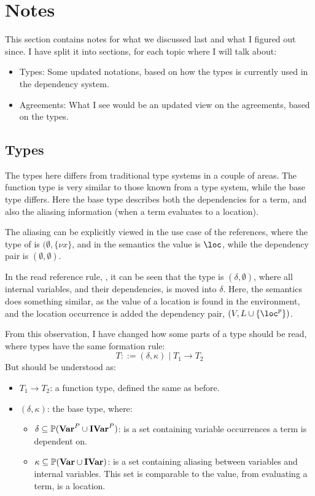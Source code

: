 \documentclass[../../master.tex]{subfiles}
\begin{document}
\section{Notes}
This section contains notes for what we discussed last and what I figured out since.
I have split it into sections, for each topic where I will talk about:
\begin{itemize}
	\item Types: Some updated notations, based on how the types is currently used in the dependency system.
	\item Agreements: What I see would be an updated view on the agreements, based on the types.
\end{itemize}
	

\subsection{Types}
The types here differs from traditional type systems in a couple of areas.
The function type is very similar to those known from a type system, while the base type differs.
Here the base type describes both the dependencies for a term, and also the aliasing information (when a term evaluates to a location).

The aliasing can be explicitly viewed in the use case of the references, where the type of  is $(\emptyset,\{\nu x\}$, and in the semantics the value is $\loc$, while the dependency pair is $(\emptyset,\emptyset)$.

In the read reference rule, , it can be seen that the type is $(\delta,\emptyset)$, where all internal variables, and their dependencies, is moved into $\delta$.
Here, the semantics does something similar, as the value of a location is found in the environment, and the location occurrence is added the dependency pair, $(V,L\cup\{\loc^p\})$.

From this observation, I have changed how some parts of a type should be read, where types have the same formation rule:
$$T::= (\delta,\kappa)\mid T_1\rightarrow T_2$$
But should be understood as:
\begin{itemize}
	\item $T_1\rightarrow T_2$: a function type, defined the same as before.
	\item $(\delta,\kappa)$: the base type, where:
	\begin{itemize}
		\item $\delta\subseteq\mathbb{P}(\textbf{Var}^P\cup\textbf{IVar}^P)$: is a set containing variable occurrences a term is dependent on.
		\item $\kappa\subseteq\mathbb{P}(\textbf{Var}\cup\textbf{IVar})$: is a set containing aliasing between variables and internal variables.
			This set is comparable to the value, from evaluating a term, is a location.
	\end{itemize}
\end{itemize}
\end{document}
